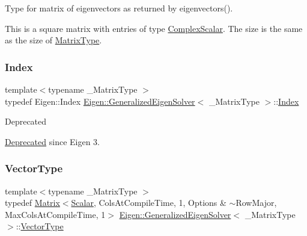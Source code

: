 Type for matrix of eigenvectors as returned by eigenvectors(). 

This is a square matrix with entries of type \mbox{\hyperlink{class_eigen_1_1_generalized_eigen_solver_abdec07af91db1345bb4c74066e3d0ea7}{Complex\+Scalar}}. The size is the same as the size of \mbox{\hyperlink{class_eigen_1_1_generalized_eigen_solver_a56f4b9823bb9a267de3aaf48428cd247}{Matrix\+Type}}. \mbox{\label{class_eigen_1_1_generalized_eigen_solver_a46a0ff3841059479ec314e56a5645302}} 
\subsubsection{\texorpdfstring{Index}{Index}}
{\footnotesize\ttfamily template$<$typename \+\_\+\+Matrix\+Type $>$ \\
typedef Eigen\+::\+Index \mbox{\hyperlink{class_eigen_1_1_generalized_eigen_solver}{Eigen\+::\+Generalized\+Eigen\+Solver}}$<$ \+\_\+\+Matrix\+Type $>$\+::\mbox{\hyperlink{class_eigen_1_1_generalized_eigen_solver_a46a0ff3841059479ec314e56a5645302}{Index}}}

\begin{DoxyRefDesc}{Deprecated}
\item[\mbox{\hyperlink{deprecated__deprecated000019}{Deprecated}}]since Eigen 3. \end{DoxyRefDesc}
\mbox{\label{class_eigen_1_1_generalized_eigen_solver_a5aa3d1390c2b0d455c1c9b8b3101b119}} 
\subsubsection{\texorpdfstring{VectorType}{VectorType}}
{\footnotesize\ttfamily template$<$typename \+\_\+\+Matrix\+Type $>$ \\
typedef \mbox{\hyperlink{class_eigen_1_1_matrix}{Matrix}}$<$\mbox{\hyperlink{class_eigen_1_1_generalized_eigen_solver_afb318d0b097ff8dd5a7410d31317ca47}{Scalar}}, Cols\+At\+Compile\+Time, 1, Options \& $\sim$Row\+Major, Max\+Cols\+At\+Compile\+Time, 1$>$ \mbox{\hyperlink{class_eigen_1_1_generalized_eigen_solver}{Eigen\+::\+Generalized\+Eigen\+Solver}}$<$ \+\_\+\+Matrix\+Type $>$\+::\mbox{\hyperlink{class_eigen_1_1_generalized_eigen_solver_a5aa3d1390c2b0d455c1c9b8b3101b119}{Vector\+Type}}}



